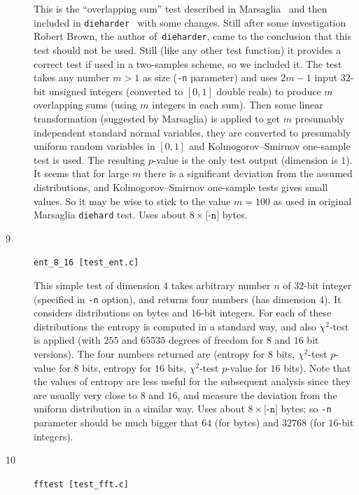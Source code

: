 \documentclass[12pt,a4paper,fullpage]{article}
\begin{document}
\begin{description}
This is the ``overlapping sum'' test described in Marsaglia~\cite{marsaglia-diehard} and then included in \texttt{dieharder}~\cite{dieharder} with some changes. Still after some investigation Robert Brown, the author of~\texttt{dieharder}, came to the conclusion that this test should not be used. Still (like any other test function) it provides a correct test if used in a two-samples scheme, so we included it. The test takes any number $m>1$ as size (\texttt{-n} parameter) and uses $2m-1$ input $32$-bit unsigned integers (converted to $[0,1]$ double reals) to produce $m$ overlapping sums (using $m$ integers in each sum). Then some linear transformation (suggested by Marsaglia) is applied to get $m$ presumably independent standard normal variables, they are converted to presumably uniform random variables in $[0,1]$ and Kolmogorov--Smirnov one-sample test is used. The resulting $p$-value is the only test output (dimension is $1$). It seems that for large $m$ there is a significant deviation from the assumed distributions, and Kolmogorov--Smirnov one-sample tests gives small values. So it may be wise to stick to the value $m=100$ as used in original Marsaglia \texttt{diehard} test. Uses about $8\times\texttt{[-n]}$ bytes.

\item[9] \texttt{ent\_8\_16 [test\_ent.c]}

This simple test of dimension $4$ takes arbitrary number $n$ of $32$-bit integer (specified in \texttt{-n} option), and returns four numbers (has dimension $4$). It considers distributions on bytes and $16$-bit integers. For each of these distributions the entropy is computed in a standard way, and also $\chi^2$-test is applied (with $255$ and $65535$ degrees of freedom for $8$ and $16$ bit versions). The four numbers returned are (entropy for $8$ bits, $\chi^2$-test $p$-value for $8$ bits, entropy for $16$ bits, $\chi^2$-test $p$-value for $16$ bits). Note that the values of entropy are less useful for the subsequent analysis since they are usually very close to $8$ and $16$, and measure the deviation from the uniform distribution in a similar way. Uses about $8\times\texttt{[-n]}$ bytes; so \texttt{-n} parameter should be much bigger that $64$ (for bytes) and $32768$ (for $16$-bit integers).

\item[10] \texttt{fftest [test\_fft.c]}


\end{description}
\end{document}
